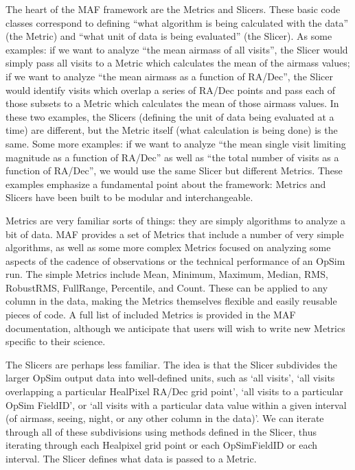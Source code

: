 \documentclass[]{spie}  %
\begin{document}
The heart of the MAF framework are the Metrics and Slicers. These
basic code classes correspond to defining ``what algorithm is being
calculated with the data'' (the Metric) and ``what unit of data is being
evaluated'' (the Slicer). As some examples: if we want to
analyze ``the mean airmass of all visits'', the Slicer would simply
pass all visits to a Metric which calculates the mean of the airmass
values; if we want to analyze ``the mean airmass as a function of
RA/Dec'', the Slicer would identify visits which overlap a series of
RA/Dec points and pass each of those subsets to a Metric which
calculates the mean of those airmass values. In these two examples,
the Slicers (defining the unit of data being evaluated at a time) are
different, but the Metric itself (what calculation is being done) is
the same. Some more examples: if we want to analyze ``the mean single
visit limiting magnitude as a function of RA/Dec'' as well as ``the
total number of visits as a function of RA/Dec'', we would use the
same Slicer but different Metrics. These examples emphasize a
fundamental point about the framework: Metrics and Slicers have been
built to be modular and interchangeable.

Metrics are very familiar sorts of things: they are simply
algorithms to analyze a bit of data. MAF provides a set of Metrics
that include a number of very simple algorithms, as well as some more
complex Metrics focused on analyzing some aspects of the cadence of
observations or the technical performance of an OpSim run. The simple
Metrics include Mean, Minimum, Maximum, Median, RMS, RobustRMS, FullRange,
Percentile, and Count. These can be applied to any column in the data,
making the Metrics themselves flexible and easily reusable pieces of
code. A full list of included Metrics is provided in the MAF
documentation, although we anticipate that users will wish to write
new Metrics specific to their science.

The Slicers are perhaps less familiar. The idea is that the Slicer
subdivides the larger OpSim output data into well-defined units, such as `all
visits', `all visits overlapping a particular HealPixel RA/Dec grid
point', `all visits to a particular OpSim FieldID', or `all visits
with a particular data value within a given interval (of airmass, seeing, night, or any other
column in the data)'. We can iterate through all of these subdivisions
using methods defined in the Slicer, thus iterating through each
Healpixel grid point or each OpSimFieldID or each interval. The
Slicer defines what data is passed to a Metric. 
\end{document}
